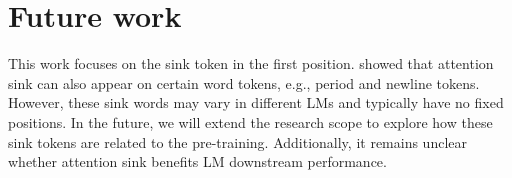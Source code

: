 
\vspace{-0.1cm}
\section{Future work}
\vspace{-0.1cm}
This work focuses on the sink token in the first position. \citet{sun2024massive,yu2024unveiling} showed that attention sink can also appear on certain word tokens, e.g., period and newline tokens. However, these sink words may vary in different LMs and typically have no fixed positions. In the future, we will extend the research scope to explore how these sink tokens are related to the pre-training. Additionally, it remains unclear whether attention sink benefits LM downstream performance.

